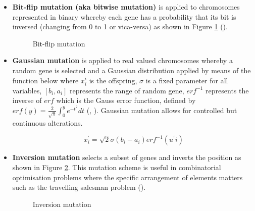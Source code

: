 \begin{itemize}
	\item \textbf{Bit-flip mutation (aka bitwise mutation)} is applied to chromosomes represented in binary whereby each gene has a probability that its bit is inversed (changing from 0 to 1 or vica-versa) as shown in Figure \ref{fig:bitflip} (\cite{intelligentOptimization}).
	
	\begin{figure}[H] %
		\centering %
		\caption{Bit-flip mutation}
		\label{fig:bitflip} %
	\end{figure}

	\item \textbf{Gaussian mutation} is applied to real valued chromosomes whereby a random gene is selected and a Gaussian distribution applied by means of the function below where $x_{i}^{i}$ is the offspring, $\sigma$ is a fixed parameter for all variables, $[b_{i}, a_{i}]$ represents the range of random gene, $erf^{-1}$ represents the inverse of $erf$ which is the Gauss error function, defined by $erf(y) = \frac{2}{\sqrt{\pi}}\int^{y}_{0}e^{-t^2}dt$ (\cite{bell2022applicationsgaussianmutationself}, \cite{gaussianMutation}). Gaussian mutation allows for controlled but continuous alterations.
	
	\begin{equation}
		x_{i}^{'} = \sqrt{2} \sigma(b_{i} - a_{i}) erf^{-1}(u^{'}i)
	\end{equation}

	\item \textbf{Inversion mutation} selects a subset of genes and inverts the position as shown in Figure \ref{fig:inversion}. This mutation scheme is useful in combinatorial optimisation problems where the specific arrangement of elements matters such as the travelling salesman problem (\cite{intelligentOptimization}).
	
	\begin{figure}[H] %
		\centering %
		\caption{Inversion mutation}
		\label{fig:inversion} %
	\end{figure}

\end{itemize}

